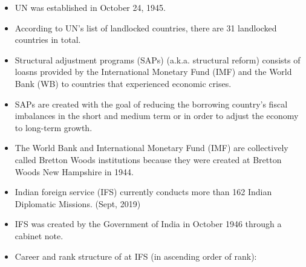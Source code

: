 \documentclass[
]{book}
\providecommand{\tightlist}{%
  \setlength{\itemsep}{0pt}\setlength{\parskip}{0pt}}
\begin{document}
\begin{itemize}
\tightlist
\item
  UN was established in October 24, 1945.
\item
  According to UN's list of landlocked countries, there are 31 landlocked countries in total.
\item
  Structural adjustment programs (SAPs) (a.k.a. structural reform) consists of loasns provided by the International Monetary Fund (IMF) and the World Bank (WB) to countries that experienced economic crises.
\item
  SAPs are created with the goal of reducing the borrowing country's fiscal imbalances in the short and medium term or in order to adjust the economy to long-term growth.
\item
  The World Bank and International Monetary Fund (IMF) are collectively called Bretton Woods institutions because they were created at Bretton Woods New Hampshire in 1944.
\item
  Indian foreign service (IFS) currently conducts more than 162 Indian Diplomatic Missions. (Sept, 2019)
\item
  IFS was created by the Government of India in October 1946 through a cabinet note.
\item
  Career and rank structure of at IFS (in ascending order of rank):


\end{itemize}
\end{document}
